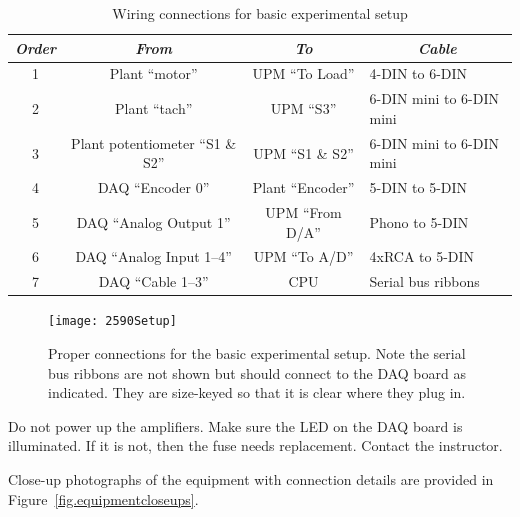\begin{table}[bht]
\centering
\renewcommand{\arraystretch}{1.1}
\begin{tabular}{c | c | c | l}
    \textit{Order}  &   \textit{From}   &   \textit{To} & \multicolumn{1}{c}{\textit{Cable}} \\
        \hline \hline
    1   &   Plant ``motor''     &   UPM ``To Load'' &   4-DIN to 6-DIN \\
    2   &   Plant ``tach''      &   UPM ``S3''      &   6-DIN mini to 6-DIN
                                                        mini \\
    3   &   Plant potentiometer ``S1 \& S2''
                                &   UPM ``S1 \& S2''&   6-DIN mini to 6-DIN
                                                        mini \\
    4   &   DAQ ``Encoder 0''   &   Plant ``Encoder''&  5-DIN to 5-DIN \\
    5   &   DAQ ``Analog Output 1''
                                &   UPM ``From D/A''&   Phono to 5-DIN \\
    6   &   DAQ ``Analog Input 1--4''
                                &   UPM ``To A/D''  &   4xRCA to 5-DIN \\
    7   &   DAQ ``Cable 1--3''  &   CPU             &   Serial bus ribbons
\end{tabular}
\caption{\footnotesize
        Wiring connections for basic experimental setup
        \label{tab.daqconnections}
        }
\end{table}

\begin{figure}[bht]
\centering
\texttt{[image: 2590Setup]}
\caption{\footnotesize
        Proper connections for the basic experimental setup.  Note the serial bus ribbons are not shown but should connect to the DAQ board as indicated.  They are size-keyed so that it is clear where they plug in.
        \label{fig.daqconnections}
        }
\end{figure}

Do not power up the amplifiers.  Make sure the LED on the DAQ board is illuminated.  If it is not, then the fuse needs replacement.  Contact the instructor.
\par
Close-up photographs of the equipment with connection details are provided in Figure~\ref{fig.equipmentcloseups}.


